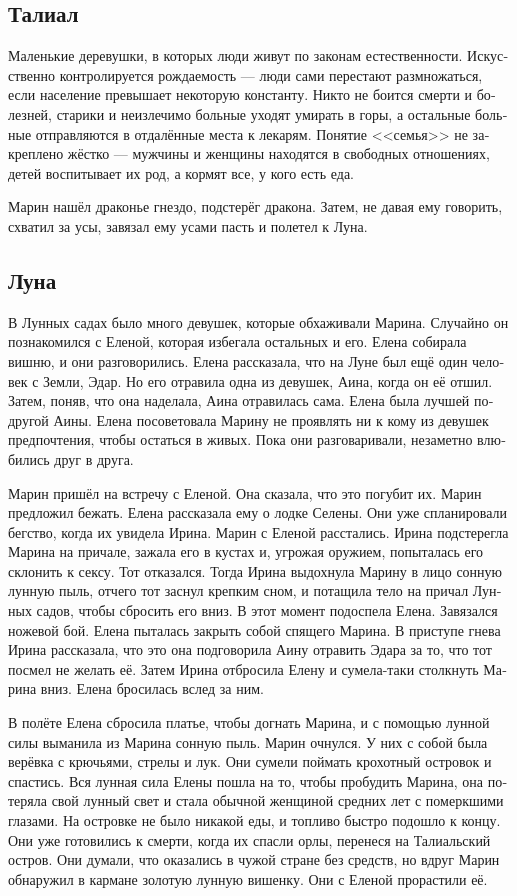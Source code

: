 \documentclass[a4paper,12pt,fleqn]{book}\usepackage{cooltooltips}\usepackage{polyglossia}\setdefaultlanguage[babelshorthands=true]{russian}\setotherlanguage{english}\defaultfontfeatures{Ligatures=TeX,Mapping=tex-text} \usepackage{xcolor}\definecolor{lightgray}{HTML}{bbbbbb}\color{lightgray}\newcommand{\ml}[3]{\textenglish{\textcolor{black}{#3}}}
\begin{document}
{\subsection{Талиал}

Маленькие деревушки, в которых люди живут по законам естественности.
Искусственно контролируется рождаемость --- люди сами перестают размножаться, если население превышает некоторую константу.
Никто не боится смерти и болезней, старики и неизлечимо больные уходят умирать в горы, а остальные больные отправляются в отдалённые места к лекарям.
Понятие <<семья>> не закреплено жёстко --- мужчины и женщины находятся в свободных отношениях, детей воспитывает их род, а кормят все, у кого есть еда. 

Марин нашёл драконье гнездо, подстерёг дракона.
Затем, не давая ему говорить, схватил за усы, завязал ему усами пасть и полетел к Луна.

\subsection{Луна}

В Лунных садах было много девушек, которые обхаживали Марина.
Случайно он познакомился с Еленой, которая избегала остальных и его.
Елена собирала вишню, и они разговорились.
Елена рассказала, что на Луне был ещё один человек с Земли, Эдар.
Но его отравила одна из девушек, Аина, когда он её отшил.
Затем, поняв, что она наделала, Аина отравилась сама.
Елена была лучшей подругой Аины.
Елена посоветовала Марину не проявлять ни к кому из девушек предпочтения, чтобы остаться в живых.
Пока они разговаривали, незаметно влюбились друг в друга.

Марин пришёл на встречу с Еленой.
Она сказала, что это погубит их.
Марин предложил бежать.
Елена рассказала ему о лодке Селены.
Они уже спланировали бегство, когда их увидела Ирина.
Марин с Еленой расстались.
Ирина подстерегла Марина на причале, зажала его в кустах и, угрожая оружием, попыталась его склонить к сексу.
Тот отказался.
Тогда Ирина выдохнула Марину в лицо сонную лунную пыль, отчего тот заснул крепким сном, и потащила тело на причал Лунных садов, чтобы сбросить его вниз.
В этот момент подоспела Елена.
Завязался ножевой бой.
Елена пыталась закрыть собой спящего Марина.
В приступе гнева Ирина рассказала, что это она подговорила Аину отравить Эдара за то, что тот посмел не желать её.
Затем Ирина отбросила Елену и сумела-таки столкнуть Марина вниз.
Елена бросилась вслед за ним.

В полёте Елена сбросила платье, чтобы догнать Марина, и с помощью лунной силы выманила из Марина сонную пыль.
Марин очнулся.
У них с собой была верёвка с крючьями, стрелы и лук.
Они сумели поймать крохотный островок и спастись.
Вся лунная сила Елены пошла на то, чтобы пробудить Марина, она потеряла свой лунный свет и стала обычной женщиной средних лет с померкшими глазами.
На островке не было никакой еды, и топливо быстро подошло к концу.
Они уже готовились к смерти, когда их спасли орлы, перенеся на Талиальский остров.
Они думали, что оказались в чужой стране без средств, но вдруг Марин обнаружил в кармане золотую лунную вишенку.
Они с Еленой прорастили её.

}
\end{document}
